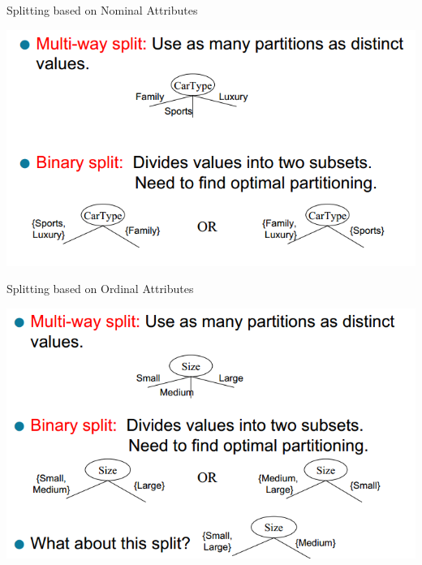 \documentclass{beamer}
\begin{document}
\begin{frame}{Splitting based on Nominal Attributes}
    \begin{center}
        \includegraphics[scale=0.4]{splittingNominalAttr.png}
    \end{center}
\end{frame}
\begin{frame}{Splitting based on Ordinal Attributes}
    \begin{center}
        \includegraphics[scale=0.4]{splittingOrdinalAttr.png}
    \end{center}
\end{frame}
\end{document}

